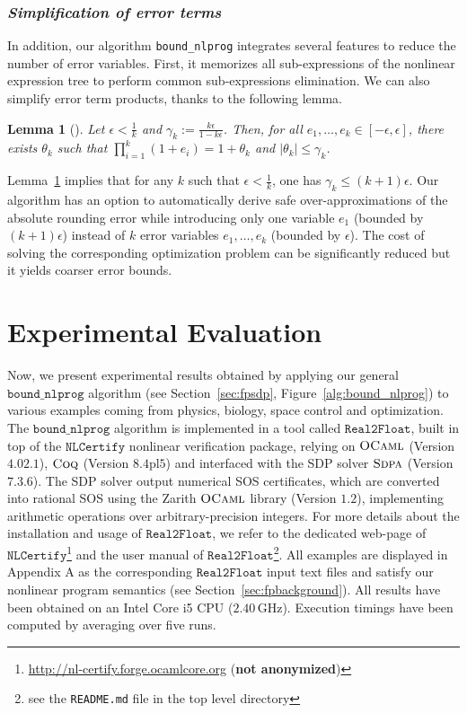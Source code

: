 \documentclass[preprint]{sigplanconf}
\newcommand{\code}[1]{\lstinline{#1}}
\newcommand{\boundnlprog}{\mathtt{bound\_nlprog}}
\newcommand{\realtofloat}{\mathtt{Real2Float}}
\newcommand{\coq}{\text{\sc Coq}}
\newcommand{\ocaml}{\text{\sc OCaml}}
\newcommand{\sdpa}{\text{\sc Sdpa}}
\newcommand{\nlcertify}{\mathtt{NLCertify}}
\newtheorem{lemma}[theorem]{Lemma}
\theoremstyle{plain}
\begin{document}
\subsubsection*{\textit{Simplification of error terms}}
%
In addition, our algorithm \code{bound_nlprog} integrates several features to reduce the number of error variables. First, it memorizes all sub-expressions of the nonlinear expression tree to perform common sub-expressions elimination. 
We can also simplify error term products, thanks to the following lemma.
\begin{lemma}[]
\label{th:redproduct}
Let $\epsilon < \frac{1}{k}$ and $\gamma_k := \frac{k \epsilon}{1 - k \epsilon}$. Then, for all $e_1, \dots, e_k \in [-\epsilon, \epsilon]$, there exists $\theta_k$ such that ${\prod_{i=1}^k (1 + e_i) = 1 + \theta_k}$ and $\mid \theta_k \mid \leq \gamma_k$.
\end{lemma}
%
Lemma~\ref{th:redproduct} implies that for any $k$ such that $\epsilon < \frac{1}{k}$, one has $\gamma_k \leq (k + 1) \epsilon$. Our algorithm has an option to automatically derive safe over-approximations of the absolute rounding error while introducing only one variable $e_1$ (bounded by $(k + 1) \epsilon$) instead of $k$ error variables $e_1, \dots, e_k$ (bounded by $\epsilon$). The cost of solving the corresponding optimization problem can be significantly reduced but it yields coarser error bounds.
%
\section{Experimental Evaluation}
\label{sec:benchs}
%
Now, we present experimental results obtained by applying our general $\boundnlprog$ algorithm (see Section~\ref{sec:fpsdp}, Figure~\ref{alg:bound_nlprog}) to various examples coming from physics, biology, space control and optimization. 
The  $\boundnlprog$ algorithm is implemented in a tool called $\realtofloat$, built in top of the $\nlcertify$ nonlinear verification package, relying on $\ocaml$ (Version $4.02.1$), $\coq$ (Version $8.4\text{pl}5$) and interfaced with the SDP solver $\sdpa$ (Version $7.3.6$). The SDP solver output numerical SOS certificates, which are converted into rational SOS using the {\sc Zarith} $\ocaml$ library (Version $1.2$), implementing arithmetic operations over arbitrary-precision integers.
For more details about the installation and usage of $\realtofloat$, we refer to the dedicated web-page of $\nlcertify$\footnote{\url{http://nl-certify.forge.ocamlcore.org} (\textbf{not anonymized})} and the user manual of $\realtofloat$\footnote{see the \texttt{README.md} file in the top level directory}. 
All examples are displayed in Appendix A as the corresponding $\realtofloat$ input text files and satisfy our nonlinear program semantics (see Section~\ref{sec:fpbackground}). All results have been obtained on an Intel Core i5 CPU ($2.40\, $GHz). Execution timings have been computed by averaging over five runs.
%
\end{document}
